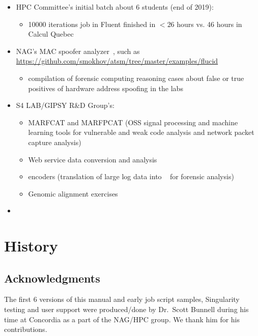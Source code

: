 \documentclass{easychair}
\begin{document}
\begin{itemize}
	\item 
HPC Committee's initial batch about 6 students (end of 2019):
\begin{itemize}
	\item 
10000 iterations job in Fluent finished in $<26$ hours vs. 46 hours in Calcul Quebec
\end{itemize}
	\item 
NAG's MAC spoofer analyzer~\cite{mac-spoofer-analyzer-intro-c3s2e2014,mac-spoofer-analyzer-detail-fps2014},
such as \url{https://github.com/smokhov/atsm/tree/master/examples/flucid}
\begin{itemize}
	\item 
compilation of forensic computing reasoning cases about false or true positives of hardware address spoofing in the labs
\end{itemize}
	\item 
S4 LAB/GIPSY R\&D Group's:
\begin{itemize}
	\item 
MARFCAT and MARFPCAT (OSS signal processing and machine learning tools for 
vulnerable and weak code analysis and network packet capture
analysis)~\cite{marfcat-nlp-ai2014,marfcat-sate2010-nist,fingerprinting-mal-traffic}
	\item 
Web service data conversion and analysis
	\item 
{\flucid} encoders (translation of large log data into {\flucid}~\cite{mokhov-phd-thesis-2013} for forensic analysis)
	\item 
Genomic alignment exercises
\end{itemize}
\item
{}
\end{itemize}

\appendix

\section{History}

\subsection{Acknowledgments}
\label{sect:scott-acks}

The first 6 versions of this manual and early job script samples,
Singularity testing and user support were produced/done by Dr.~Scott Bunnell
during his time at Concordia as a part of the NAG/HPC group. We thank
him for his contributions.
\end{document}
